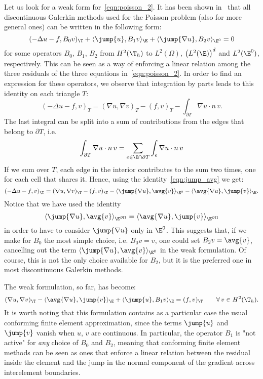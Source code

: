 Let us look for a weak form for~\eqref{eqn:poisson_2}. It has been shown in~\cite{bcms04} that all discontinuous Galerkin methods used for the Poisson problem (also for more general ones) can be written in the following form:
\[
(-\Delta u - f, B_0 v)_\T + \langle \jump{u}, B_1 v \rangle_\E + \langle \jump{\nabla u}, B_2 v \rangle_{\E^0} = 0
\]
for some operators $B_0$, $B_1$, $B_2$ from $H^2(\T_h)$ to $L^2(\Omega)$, $\bigl(L^2(\E)\bigr)^d$ and $L^2(\E^0)$, respectively. This can be seen as a way of enforcing a linear relation among the three residuals of the three equations in~\eqref{eqn:poisson_2}. In order to find an expression for these operators, we observe that integration by parts leads to this identity on each triangle $T$:
\[
(- \Delta u - f , v )_T = (\nabla u, \nabla v)_T - (f,v)_T - \int_{\partial T} \nabla u \cdot n \,v.
\]
The last integral can be split into a sum of contributions from the edges that belong to $\partial T$, i.e.
\[
\int_{\partial T} \nabla u \cdot n \,v = \sum_{e \in \E \cap \partial T} \int_{e} \nabla u \cdot n \,v
\]
If we sum over $T$, each edge in the interior contributes to the sum two times, one for each cell that shares it. Hence, using the identity~\eqref{eqn:jump_avg} we get:
\[
(- \Delta u - f , v )_\T = (\nabla u, \nabla v)_\T - (f,v)_\T -
\langle \jump{\nabla u}, \avg{v} \rangle_{\E^0} -
\langle \avg{\nabla u}, \jump{v} \rangle_{\E}.
\]
Notice that we have used the identity
\[
\langle \jump{\nabla u}, \avg{v} \rangle_{\E^{\partial\Omega}}
= \langle \avg{\nabla u}, \jump{v} \rangle_{\E^{\partial\Omega}}
\]
in order to have to consider $\jump{\nabla u}$ only in $\E^0$. This suggests that, if we make for $B_0$ the most simple choice, i.e. $B_0 v = v$, one could set $B_2 v = \avg{v}$, cancelling out the term $\langle \jump{\nabla u}, \avg{v} \rangle_{\E^0}$ in the weak formulation. Of course, this is not the only choice available for $B_2$, but it is the preferred one in most discontinuous Galerkin methods.

The weak formulation, so far, has become:
\[
(\nabla u, \nabla v)_\T -
\langle \avg{\nabla u}, \jump{v} \rangle_{\E} + 
\langle \jump{u}, B_1 v \rangle_\E = (f,v)_\T \qquad \forall \, v \in H^2(\T_h).
\]
It is worth noting that this formulation contains as a particular case the usual conforming finite element approximation, since the terms $\jump{u}$ and $\jump{v}$ vanish when $u$, $v$ are continuous. In particular, the operator $B_1$ is "not active" for \emph{any} choice of $B_0$ and $B_2$, meaning that conforming ﬁnite element methods can be seen as ones that enforce a linear relation between the residual inside the element and the jump in the normal component of the gradient across interelement boundaries.

